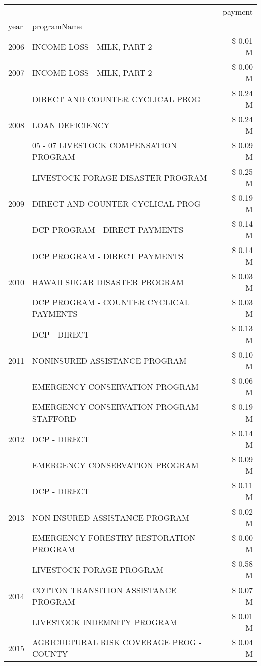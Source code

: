 \begin{tabular}{llr}
\toprule
 &  & payment \\
year & programName &  \\
\midrule
2006 & INCOME LOSS - MILK, PART 2 & \$ 0.01 M \\
\cline{1-3}
2007 & INCOME LOSS - MILK, PART 2 & \$ 0.00 M \\
\cline{1-3}
\multirow[t]{3}{*}{2008} & DIRECT AND COUNTER CYCLICAL PROG & \$ 0.24 M \\
 & LOAN DEFICIENCY & \$ 0.24 M \\
 & 05 - 07 LIVESTOCK COMPENSATION PROGRAM & \$ 0.09 M \\
\cline{1-3}
\multirow[t]{3}{*}{2009} & LIVESTOCK FORAGE DISASTER  PROGRAM & \$ 0.25 M \\
 & DIRECT AND COUNTER CYCLICAL PROG & \$ 0.19 M \\
 & DCP PROGRAM - DIRECT PAYMENTS & \$ 0.14 M \\
\cline{1-3}
\multirow[t]{3}{*}{2010} & DCP PROGRAM - DIRECT PAYMENTS & \$ 0.14 M \\
 & HAWAII SUGAR DISASTER PROGRAM & \$ 0.03 M \\
 & DCP PROGRAM - COUNTER CYCLICAL PAYMENTS & \$ 0.03 M \\
\cline{1-3}
\multirow[t]{3}{*}{2011} & DCP - DIRECT & \$ 0.13 M \\
 & NONINSURED ASSISTANCE PROGRAM & \$ 0.10 M \\
 & EMERGENCY CONSERVATION PROGRAM & \$ 0.06 M \\
\cline{1-3}
\multirow[t]{3}{*}{2012} & EMERGENCY CONSERVATION PROGRAM STAFFORD & \$ 0.19 M \\
 & DCP - DIRECT & \$ 0.14 M \\
 & EMERGENCY CONSERVATION PROGRAM & \$ 0.09 M \\
\cline{1-3}
\multirow[t]{3}{*}{2013} & DCP - DIRECT & \$ 0.11 M \\
 & NON-INSURED ASSISTANCE PROGRAM & \$ 0.02 M \\
 & EMERGENCY FORESTRY RESTORATION PROGRAM & \$ 0.00 M \\
\cline{1-3}
\multirow[t]{3}{*}{2014} & LIVESTOCK FORAGE PROGRAM & \$ 0.58 M \\
 & COTTON TRANSITION ASSISTANCE PROGRAM & \$ 0.07 M \\
 & LIVESTOCK INDEMNITY PROGRAM & \$ 0.01 M \\
\cline{1-3}
\multirow[t]{3}{*}{2015} & AGRICULTURAL RISK COVERAGE PROG - COUNTY & \$ 0.04 M \\

\end{tabular}
